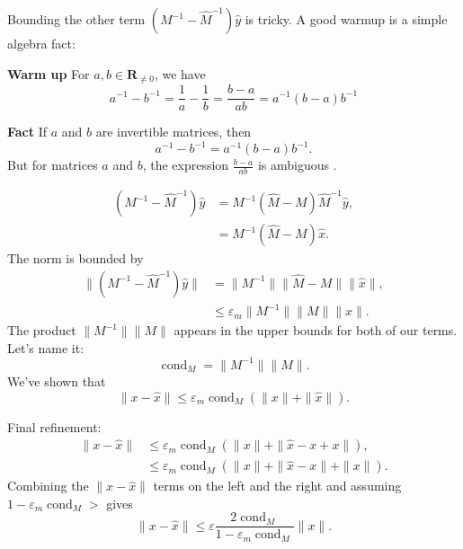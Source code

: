 \documentclass[usenames,dvipsnames,fleqn]{beamer}
\newcommand{\reals}{\mathbf{R}}
\DeclareMathOperator{\cond}{cond}
\theoremstyle{definition}
\begin{document}
\begin{frame}

Bounding the other term \( \left(M^{-1} - \widehat M^{-1} \right) \widehat y \) is tricky. A good warmup 
is a simple algebra fact:

\textbf{Warm up}  For \(a,b \in \reals_{\neq 0}\), we have
\[
   a^{-1} - b^{-1} = \frac{1}{a} - \frac{1}{b} = \frac{b-a}{a b} = a^{-1} (b - a) b^{-1}
\]


\textbf{Fact} If \(a\) and \(b\) are invertible matrices, then
\[
    a^{-1} - b^{-1} = a^{-1} (b - a) b^{-1}.
\]
But for matrices \(a\) and \(b\), the expression  \(\frac{b-a}{a b}\) is ambiguous .


\end{frame}
\begin{frame}
 \begin{align*}
    \left(M^{-1} - \widehat M^{-1} \right) \widehat y &= M^{-1} (\widehat M - M) \widehat M^{-1} \widehat y, \\
    &=   M^{-1} (\widehat M - M) \widehat x.
 \end{align*}
 The norm is bounded by
 \begin{align*}
  \| \left(M^{-1} - \widehat M^{-1} \right) \widehat y \| &= \| M^{-1} \| 
     \|  \widehat M - M \| \|\widehat x \|, \\
     &\leq  \varepsilon_m  \| M^{-1} \|  \| M \|  \|\widehat x \|.
 \end{align*} 
 The product  \(\| M^{-1} \|  \| M \| \) appears in the upper bounds for both of our terms. Let's name it:
 \[
    \cond_M = \| M^{-1} \|  \| M \|.
 \]
 We've shown that 
 \[
    \| x - \widehat x \| \leq \varepsilon_m \cond_M \left (\| x \| + \| \widehat x \| \right).
 \]
\end{frame}
\begin{frame}
Final refinement:
\begin{align*} 
    \| x - \widehat x \| & \leq \varepsilon_m \cond_M \left (\| x \| + \| \widehat x - x + x \| \right), \\
                &\leq  \varepsilon_m \cond_M \left (\| x \| + \| \widehat x - x  \| + \| x \| \right).
 \end{align*}
 Combining the \(\| x - \widehat x \| \) terms on the left and the right and assuming 
 \(1 - \varepsilon_m \cond_M   > \) gives
 \[
     \| x - \widehat x \| \leq \varepsilon \frac{2 \cond_M}{1 - \varepsilon_m \cond_M } \| x \| .
 \]
\end{frame}
\end{document}
